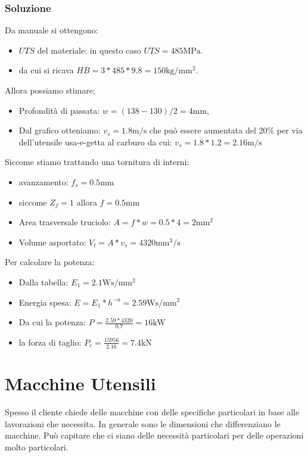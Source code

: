 
\subsection*{Soluzione}
Da manuale si ottengono: 
\begin{itemize}
\item $UTS$ del materiale: in questo caso $UTS = 485\unit{\MPa}$.
\item da cui si ricava $HB = 3*485*9.8=150\unit{\kg/\mm^2}$.
\end{itemize}
Allora possiamo stimare;
\begin{itemize}
\item Profondità di passata: $w = (138-130)/2 = 4\unit{\mm}$,
\item Dal grafico otteniamo: $v_s = 1.8\unit{\m/\s}$ che può essere aumentata del 20\% per via dell'utensile usa-e-getta al carburo da cui: $v_s = 1.8 * 1.2 = 2.16\unit{\m/\s}$
\end{itemize}
Siccome stiamo trattando una tornitura di interni:
\begin{itemize}
\item avanzamento: $f_s = 0.5\unit{\mm}$
\item siccome $Z_f = 1$ allora $f = 0.5\unit{\mm}$
\item Area trasversale truciolo: $A = f*w = 0.5*4 = 2\unit{\mm^2}$
\item Volume asportato: $V_t = A * v_s = 4320\unit{\mm^3/\s}$
\end{itemize}
Per calcolare la potenza:
\begin{itemize}
\item Dalla tabella: $E_1 = 2.1\unit{\W\s/\mm^2}$
\item Energia spesa: $E = E_1 * h^{-a}= 2.59\unit{\W\s/\mm^2}$
\item Da cui la potenza: $P = \frac{2.59 * 4320}{0.7} = 16\unit{\kW}$
\item la forza di taglio: $P_c = \frac{15956}{2.16} = 7.4\unit{\kN}$
\end{itemize}

\chapter{Macchine Utensili}\label{chp:MacchineUtensili}
Spesso il cliente chiede delle macchine con delle specifiche particolari
in base alle lavorazioni che necessita.
In generale sono le dimensioni che differenziano le macchine.
Può capitare che ci siano delle necessità particolari per delle operazioni 
molto particolari.

